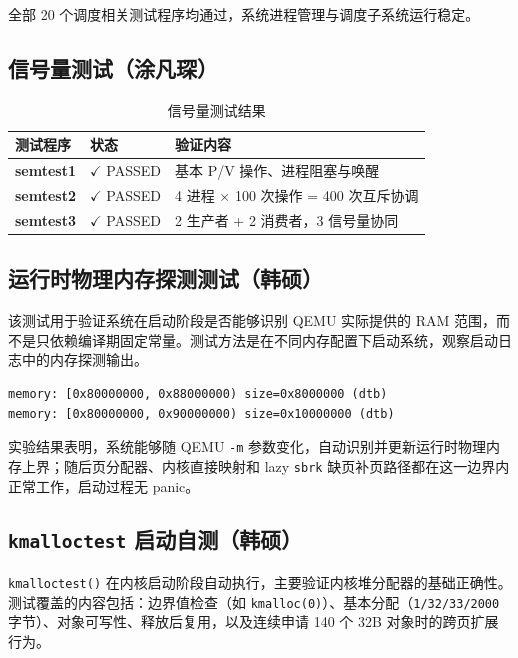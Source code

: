 \documentclass[12pt,a4paper]{ctexart}
\begin{document}
全部 20 个调度相关测试程序均通过，系统进程管理与调度子系统运行稳定。


\subsection{信号量测试（涂凡琛）}

\begin{table}[H]
\centering
\caption{信号量测试结果}
\begin{tabular}{>{\bfseries}p{2.5cm}p{2.5cm}p{7cm}}
\toprule
\textbf{测试程序} & \textbf{状态} & \textbf{验证内容} \\
\midrule
semtest1 & $\checkmark$ PASSED & 基本 P/V 操作、进程阻塞与唤醒 \\
semtest2 & $\checkmark$ PASSED & 4 进程 × 100 次操作 = 400 次互斥协调 \\
semtest3 & $\checkmark$ PASSED & 2 生产者 + 2 消费者，3 信号量协同 \\
\bottomrule
\end{tabular}
\end{table}

\subsection{运行时物理内存探测测试（韩硕）}

该测试用于验证系统在启动阶段是否能够识别 QEMU 实际提供的 RAM 范围，而不是只依赖编译期固定常量。测试方法是在不同内存配置下启动系统，观察启动日志中的内存探测输出。

\begin{lstlisting}[caption={运行时物理内存探测日志}]
memory: [0x80000000, 0x88000000) size=0x8000000 (dtb)
memory: [0x80000000, 0x90000000) size=0x10000000 (dtb)
\end{lstlisting}

实验结果表明，系统能够随 QEMU \texttt{-m} 参数变化，自动识别并更新运行时物理内存上界；随后页分配器、内核直接映射和 lazy \texttt{sbrk} 缺页补页路径都在这一边界内正常工作，启动过程无 panic。

\subsection{\texttt{kmalloctest} 启动自测（韩硕）}

\texttt{kmalloctest()} 在内核启动阶段自动执行，主要验证内核堆分配器的基础正确性。测试覆盖的内容包括：边界值检查（如 \texttt{kmalloc(0)}）、基本分配（\texttt{1/32/33/2000} 字节）、对象可写性、释放后复用，以及连续申请 140 个 32B 对象时的跨页扩展行为。
\end{document}
